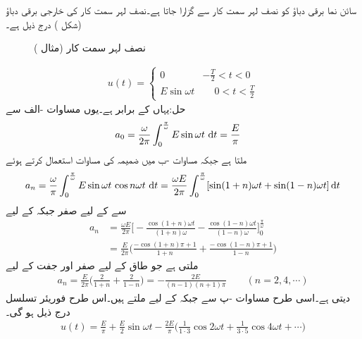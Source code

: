 \quad سائن نما برقی دباؤ  کو نصف لہر سمت کار سے گزارا جاتا ہے۔نصف لہر سمت کار کی خارجی برقی دباؤ  (شکل ) درج ذیل ہے۔
\begin{figure}
\centering
{}
\caption{نصف لہر سمت کار (مثال )}
\label{شکل_مثال_فوریئر_نصف_لہر_سمت_کار}
\end{figure}
%
 \begin{align*}
u(t)=
\begin{cases}
0&-\frac{T}{2}<t<0\\
E\sin \omega t&\phantom{-}0<t<\frac{T}{2}
\end{cases}
\end{align*}
حل:یہاں  کے برابر ہے۔یوں مساوات -الف سے
\begin{align*}
a_0&=\frac{\omega}{2\pi}\int_{0}^{\frac{\pi}{\omega}} E\sin \omega t\, \dif t=\frac{E}{\pi}
\end{align*}
ملتا ہے جبکہ مساوات -ب میں ضمیمہ  کی مساوات  استعمال کرتے ہوئے
\begin{align*}
a_n=\frac{\omega}{\pi}\int_0^{\frac{\pi}{\omega}} E\sin \omega t\,\cos n\omega t\,\dif t=\frac{\omega E}{2\pi}\int_0^{\frac{\pi}{\omega}} [\sin(1+n)\omega t+\sin(1-n)\omega t]\dif t
\end{align*}
سے  کے لیے صفر جبکہ  کے لیے
\begin{align*}
a_n&=\frac{\omega E}{2\pi}\big[-\frac{\cos(1+n)\omega t}{(1+n)\omega}-\frac{\cos(1-n)\omega t}{(1-n)\omega}\big]_{0}^{\frac{\pi}{\omega}}\\
&=\frac{E}{2\pi}\big(\frac{-\cos(1+n)\pi+1}{1+n}+\frac{-\cos(1-n)\pi+1}{1-n}\big)
\end{align*}
ملتی ہے جو طاق  کے لیے صفر اور جفت  کے لیے 
\begin{align*}
a_n=\frac{E}{2\pi}\big(\frac{2}{1+n}+\frac{2}{1-n}\big)=-\frac{2E}{(n-1)(n+1)\pi}\quad \quad (n=2,4,\cdots)
\end{align*}
دیتی ہے۔اسی طرح مساوات -پ سے  جبکہ  کے لیے   ملتے ہیں۔اس طرح فوریئر تسلسل درج ذیل ہو گی۔
\begin{align*}
u(t)=\frac{E}{\pi}+\frac{E}{2}\sin \omega t-\frac{2E}{\pi}\big(\frac{1}{1\cdot 3}\cos 2\omega t+\frac{1}{3\cdot 5}\cos 4\omega t+\cdots\big)
\end{align*}

